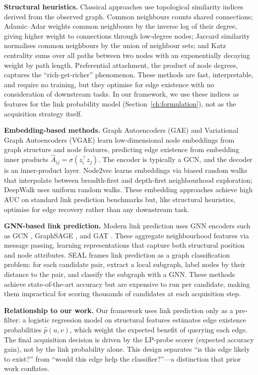\documentclass[12pt,a4paper,oneside]{report}
\begin{document}
\textbf{Structural heuristics.} Classical approaches use topological similarity indices derived from the observed graph. Common neighbours counts shared connections; Adamic--Adar \citep{adamic} weights common neighbours by the inverse log of their degree, giving higher weight to connections through low-degree nodes; Jaccard similarity normalises common neighbours by the union of neighbour sets; and Katz centrality sums over all paths between two nodes with an exponentially decaying weight by path length. Preferential attachment, the product of node degrees, captures the ``rich-get-richer'' phenomenon. These methods are fast, interpretable, and require no training, but they optimise for edge existence with no consideration of downstream tasks. In our framework, we use these indices as features for the link probability model (Section~\ref{ch:formulation}), not as the acquisition strategy itself.

\textbf{Embedding-based methods.} Graph Autoencoders (GAE) and Variational Graph Autoencoders (VGAE) \citep{kipf_vgae} learn low-dimensional node embeddings from graph structure and node features, predicting edge existence from embedding inner products $\hat{A}_{ij} = \sigma(z_i^\top z_j)$. The encoder is typically a GCN, and the decoder is an inner-product layer. Node2vec \citep{node2vec} learns embeddings via biased random walks that interpolate between breadth-first and depth-first neighbourhood exploration; DeepWalk uses uniform random walks. These embedding approaches achieve high AUC on standard link prediction benchmarks but, like structural heuristics, optimise for edge recovery rather than any downstream task.

\textbf{GNN-based link prediction.} Modern link prediction uses GNN encoders such as GCN \citep{kipf}, GraphSAGE \citep{graphsage}, and GAT \citep{gat}. These aggregate neighbourhood features via message passing, learning representations that capture both structural position and node attributes. SEAL \citep{seal} frames link prediction as a graph classification problem: for each candidate pair, extract a local subgraph, label nodes by their distance to the pair, and classify the subgraph with a GNN. These methods achieve state-of-the-art accuracy but are expensive to run per candidate, making them impractical for scoring thousands of candidates at each acquisition step.

\textbf{Relationship to our work.} Our framework uses link prediction only as a pre-filter: a logistic regression model on structural features estimates edge existence probabilities $\hat{p}(u,v)$, which weight the expected benefit of querying each edge. The final acquisition decision is driven by the LP-probe scorer (expected accuracy gain), not by the link probability alone. This design separates ``is this edge likely to exist?'' from ``would this edge help the classifier?''---a distinction that prior work conflates.
\end{document}

